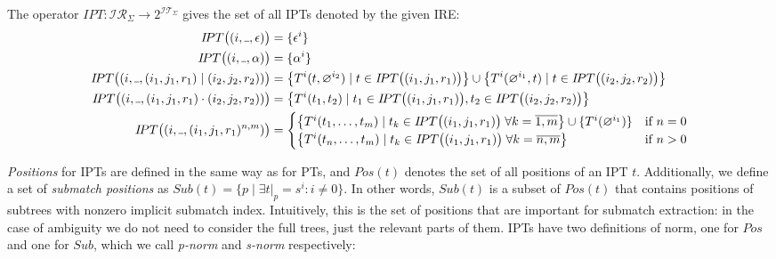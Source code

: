 \documentclass[AMA,STIX1COL]{WileyNJD-v2}
\newcommand{\Xund}{\rule{.4em}{.4pt}}
\newcommand{\XI}{\mathcal{I}}
\newcommand{\XIT}{\XI\!\XT}
\newcommand{\XIR}{\XI\!\XR}
\newcommand{\XR}{\mathcal{R}}
\newcommand{\XT}{\mathcal{T}}
\newcommand{\IPT}{I\!PT}
\begin{document}
The operator $\IPT: \XIR_\Sigma \rightarrow 2^{\XIT_\Sigma}$ gives the set of all IPTs denoted by the given IRE:
    \begin{align*}
        \IPT\big((i, \Xund, \epsilon)\big) &= \{ {\epsilon}^{i} \}
        \\
        \IPT\big((i, \Xund, \alpha)\big) &= \{ {\alpha}^{i} \}
        \\
        \IPT\big((i, \Xund, (i_1, j_1, r_1) \mid (i_2, j_2, r_2))\big) &=
            \big\{ {T}^{i}(t, \varnothing^{i_2}) \mid t \in \IPT\big((i_1, j_1, r_1)\big) \big\} \cup
            \big\{ {T}^{i}(\varnothing^{i_1}, t) \mid t \in \IPT\big((i_2, j_2, r_2)\big) \big\}
        \\
        \IPT\big((i, \Xund, (i_1, j_1, r_1) \cdot (i_2, j_2, r_2))\big) &=
            \big\{ {T}^{i}(t_1, t_2) \mid
                t_1 \in \IPT\big((i_1, j_1, r_1)\big),
                t_2 \in \IPT\big((i_2, j_2, r_2)\big)
            \big\} \\
        \IPT\big((i, \Xund, (i_1, j_1, r_1)^{n, m})\big) &=
            \begin{cases}
                \big\{ {T}^{i}(t_1, \dots, t_m) \mid t_k \in \IPT\big((i_1, j_1, r_1)\big) \;
                    \forall k = \overline{1, m} \big\} \cup \{ {T}^{i}(\varnothing^{i_1}) \} &\text{if } n = 0 \\
                \big\{ {T}^{i}(t_n, \dots, t_m) \mid t_k \in \IPT\big((i_1, j_1, r_1)\big) \;
                    \forall k = \overline{n, m} \big\} &\text{if } n > 0
            \end{cases}
    \end{align*}

\emph{Positions} for IPTs are defined in the same way as for PTs, and
$Pos(t)$ denotes the set of all positions of an IPT $t$.
Additionally, we define a set of \emph{submatch positions} as
$Sub(t) = \{ p \mid \exists t|_p = s^i : i \neq 0 \}$.
In other words, $Sub(t)$ is a subset of $Pos(t)$ that contains positions of subtrees with nonzero implicit submatch index.
Intuitively, this is the set of positions that are important for submatch extraction:
in the case of ambiguity we do not need to consider the full trees,
just the relevant parts of them.
%
IPTs have two definitions of norm, one for $Pos$ and one for $Sub$,
which we call \emph{p-norm} and \emph{s-norm} respectively:

\FloatBarrier
\end{document}
